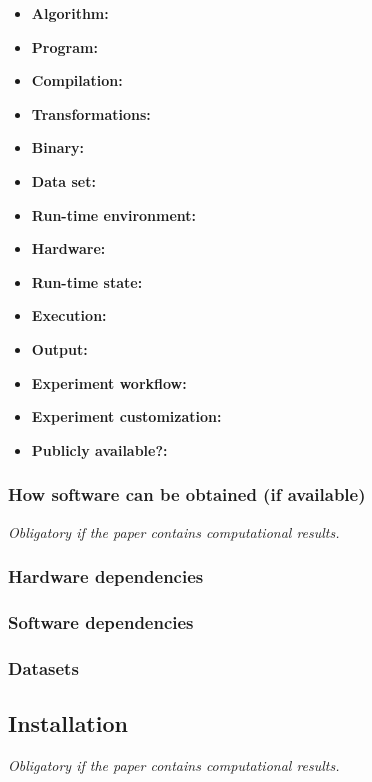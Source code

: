 \documentclass{IEEETran}
\begin{document}
{\small
\begin{itemize}
  \item {\bf Algorithm: }
  \item {\bf Program: }
  \item {\bf Compilation: }
  \item {\bf Transformations: }
  \item {\bf Binary: }
  \item {\bf Data set: }
  \item {\bf Run-time environment: }
  \item {\bf Hardware: }
  \item {\bf Run-time state: }
  \item {\bf Execution: }
  \item {\bf Output: }
  \item {\bf Experiment workflow: }
  \item {\bf Experiment customization: }
  \item {\bf Publicly available?: }
\end{itemize}
}

\subsubsection{How software can be obtained (if available)}

{\em Obligatory if the paper contains computational results.}

\subsubsection{Hardware dependencies}

\subsubsection{Software dependencies}

\subsubsection{Datasets}

\subsection{Installation}

{\em Obligatory if the paper contains computational results.}
\end{document}
